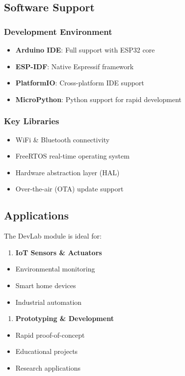 \documentclass[11pt,a4paper]{article}
\begin{document}
\subsection{Software Support}

\subsubsection{Development Environment}
\begin{itemize}
\item \textbf{Arduino IDE}: Full support with ESP32 core
\item \textbf{ESP-IDF}: Native Espressif framework
\item \textbf{PlatformIO}: Cross-platform IDE support
\item \textbf{MicroPython}: Python support for rapid development
\end{itemize}

\subsubsection{Key Libraries}
\begin{itemize}
\item WiFi & Bluetooth connectivity
\item FreeRTOS real-time operating system
\item Hardware abstraction layer (HAL)
\item Over-the-air (OTA) update support
\end{itemize}

\subsection{Applications}

The DevLab module is ideal for:

\begin{enumerate}
\item \textbf{IoT Sensors & Actuators}
\end{enumerate}
\begin{itemize}
\item Environmental monitoring
\item Smart home devices
\item Industrial automation
\end{itemize}

\begin{enumerate}
\item \textbf{Prototyping & Development}
\end{enumerate}
\begin{itemize}
\item Rapid proof-of-concept
\item Educational projects
\item Research applications
\end{itemize}
\end{document}
